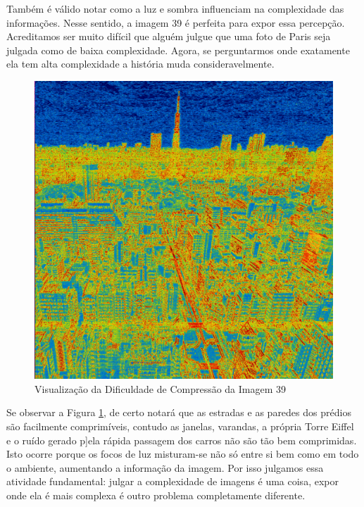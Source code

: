 \paragrafo Também é válido notar como a luz e sombra influenciam na complexidade das informações. Nesse sentido, a imagem 39 é perfeita para expor essa percepção. Acreditamos ser muito difícil que alguém julgue que uma foto de Paris seja julgada como de baixa complexidade. Agora, se perguntarmos onde exatamente ela tem alta complexidade a história muda consideravelmente. 
\begin{figure}[h!]
    \centering
    \caption{Visualização da Dificuldade de Compressão da Imagem 39}
    \label{fig:imagem_39}
    
    \includegraphics[scale=0.1]{Documeto/1-ElementosTextuais/1-Desenvolvimento/imagens-atividade3/IMG39T.png}

    
\end{figure}
Se observar a Figura \ref{fig:imagem_39}, de certo notará que as estradas e as paredes dos prédios são facilmente comprimíveis, contudo as janelas, varandas, a própria Torre Eiffel e o ruído gerado p]ela rápida passagem dos carros não são tão bem comprimidas. Isto ocorre porque os focos de luz misturam-se não só entre si bem como em todo o ambiente, aumentando a informação da imagem. Por isso julgamos essa atividade fundamental: julgar a complexidade de imagens é uma coisa, expor onde ela é mais complexa é outro problema completamente diferente.

